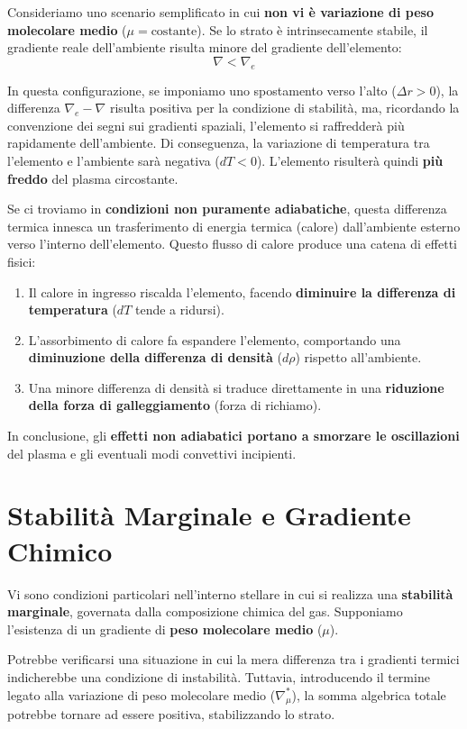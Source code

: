 Consideriamo uno scenario semplificato in cui \textbf{non vi è variazione di peso molecolare medio} ($\mu = \text{costante}$). Se lo strato è intrinsecamente stabile, il gradiente reale dell'ambiente risulta minore del gradiente dell'elemento:
\begin{equation}
\nabla < \nabla_e
\end{equation}

In questa configurazione, se imponiamo uno spostamento verso l'alto ($\Delta r > 0$), la differenza $\nabla_e - \nabla$ risulta positiva per la condizione di stabilità, ma, ricordando la convenzione dei segni sui gradienti spaziali, l'elemento si raffredderà più rapidamente dell'ambiente. Di conseguenza, la variazione di temperatura tra l'elemento e l'ambiente sarà negativa ($dT < 0$). L'elemento risulterà quindi \textbf{più freddo} del plasma circostante.

Se ci troviamo in \textbf{condizioni non puramente adiabatiche}, questa differenza termica innesca un trasferimento di energia termica (calore) dall'ambiente esterno verso l'interno dell'elemento. Questo flusso di calore produce una catena di effetti fisici:
\begin{enumerate}
\item Il calore in ingresso riscalda l'elemento, facendo \textbf{diminuire la differenza di temperatura} ($dT$ tende a ridursi).
\item L'assorbimento di calore fa espandere l'elemento, comportando una \textbf{diminuzione della differenza di densità} ($d\rho$) rispetto all'ambiente.
\item Una minore differenza di densità si traduce direttamente in una \textbf{riduzione della forza di galleggiamento} (forza di richiamo).
\end{enumerate}
In conclusione, gli \textbf{effetti non adiabatici portano a smorzare le oscillazioni} del plasma e gli eventuali modi convettivi incipienti.

\section{Stabilità Marginale e Gradiente Chimico}

Vi sono condizioni particolari nell'interno stellare in cui si realizza una \textbf{stabilità marginale}, governata dalla composizione chimica del gas. Supponiamo l'esistenza di un gradiente di \textbf{peso molecolare medio} ($\mu$).

Potrebbe verificarsi una situazione in cui la mera differenza tra i gradienti termici indicherebbe una condizione di instabilità. Tuttavia, introducendo il termine legato alla variazione di peso molecolare medio ($\nabla_\mu^*$), la somma algebrica totale potrebbe tornare ad essere positiva, stabilizzando lo strato.

